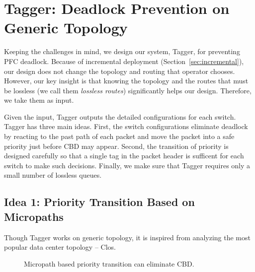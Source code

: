 \section{Tagger: Deadlock Prevention on Generic Topology}\label{sec:generic}

Keeping the challenges in mind, we design our system, Tagger, for preventing PFC deadlock.
Because of incremental deployment (Section~\ref{sec:incremental}), our design does not change the 
topology and routing that operator chooses. However, our key insight is that knowing the topology 
and the routes that must be lossless (we call them {\em lossless routes}) significantly helps our design. 
Therefore, we take them as input. 

Given the input, Tagger outputs the detailed configurations for each switch. Tagger has three main ideas. 
First, the switch configurations eliminate deadlock by reacting to the past path of each packet and move the packet
into a safe priority just before CBD may appear. Second, the transition of priority is designed carefully so that 
a single tag in the packet header is sufficent for each switch to make such decisions.
Finally, we make sure that Tagger requires only a small number of lossless queues.

\subsection{Idea 1: Priority Transition Based on Micropaths} 

Though Tagger works on generic topology, it is inspired from analyzing the most popular data center topology -- Clos.

\begin{figure}[t]
	\centering
	
	
	
	\caption{Micropath based priority transition can eliminate CBD.}\label{fig:priority_transition}
\end{figure}



